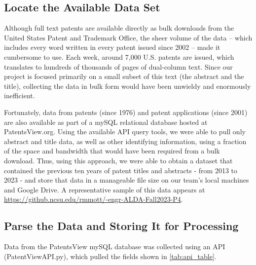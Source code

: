 \documentclass{article}
\begin{document}
\subsection{Locate the Available Data Set}

Although full text patents are available directly as bulk downloads from the United States Patent and Trademark Office, the sheer volume of the data – which includes every word written in every patent issued since 2002 – made it cumbersome to use.  Each week, around 7,000 U.S. patents are issued, which translates to hundreds of thousands of pages of dual-column text.  Since our project is focused primarily on a small subset of this text (the abstract and the title), collecting the data in bulk form would have been unwieldy and enormously inefficient.

Fortunately, data from patents (since 1976) and patent applications (since 2001) are also available as part of a mySQL relational database hosted at PatentsView.org.  Using the available API query tools, we were able to pull only abstract and title data, as well as other identifying information, using a fraction of the space and bandwidth that would have been required from a bulk download.  Thus, using this approach, we were able to obtain a dataset that contained the previous ten years of patent titles and abstracts - from 2013 to 2023 - and store that data in a manageable file size on our team’s local machines and Google Drive.  A representative sample of this data appears at \url{https://github.ncsu.edu/rmmott/-engr-ALDA-Fall2023-P4}.

\subsection{Parse the Data and Storing It for Processing}
Data from the PatentsView mySQL database was collected using an API (PatentViewAPI.py), which pulled the fields shown in \autoref{tab:api_table}.
\end{document}
